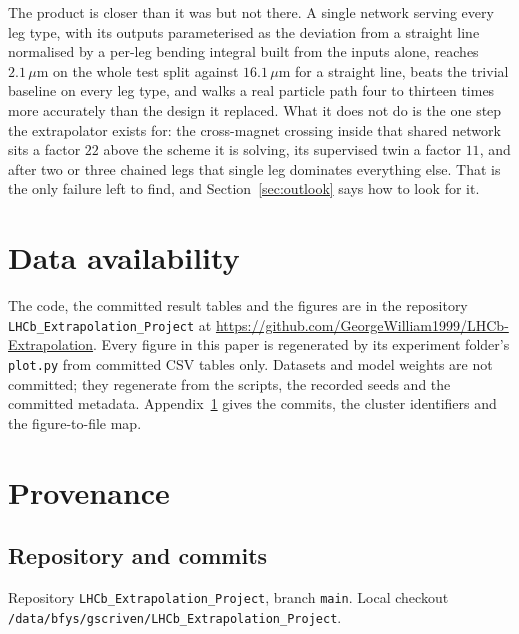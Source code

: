 \documentclass[11pt,a4paper]{article}
\newcommand{\um}{\ensuremath{\,\mu\mathrm{m}}}
\begin{document}
The product is closer than it was but not there. A single network serving every
leg type, with its outputs parameterised as the deviation from a straight line
normalised by a per-leg bending integral built from the inputs alone, reaches
$2.1\um$ on the whole test split against $16.1\um$ for a straight line, beats
the trivial baseline on every leg type, and walks a real particle path four to
thirteen times more accurately than the design it replaced. What it does not do
is the one step the extrapolator exists for: the cross-magnet crossing inside
that shared network sits a factor $22$ above the scheme it is solving, its
supervised twin a factor $11$, and after two or three chained legs that single
leg dominates everything else. That is the only failure left to find, and
Section~\ref{sec:outlook} says how to look for it.

\section*{Data availability}

The code, the committed result tables and the figures are in the repository
\texttt{LHCb\_Extrapolation\_Project} at
\url{https://github.com/GeorgeWilliam1999/LHCb-Extrapolation}. Every figure in
this paper is regenerated by its experiment folder's \texttt{plot.py} from
committed CSV tables only. Datasets and model weights are not committed; they
regenerate from the scripts, the recorded seeds and the committed metadata.
Appendix~\ref{app:prov} gives the commits, the cluster identifiers and the
figure-to-file map.

\appendix
\section{Provenance}
\label{app:prov}

\subsection*{Repository and commits}

Repository \texttt{LHCb\_Extrapolation\_Project}, branch \texttt{main}. Local
checkout \texttt{/data/bfys/gscriven/LHCb\_Extrapolation\_Project}.
\end{document}
